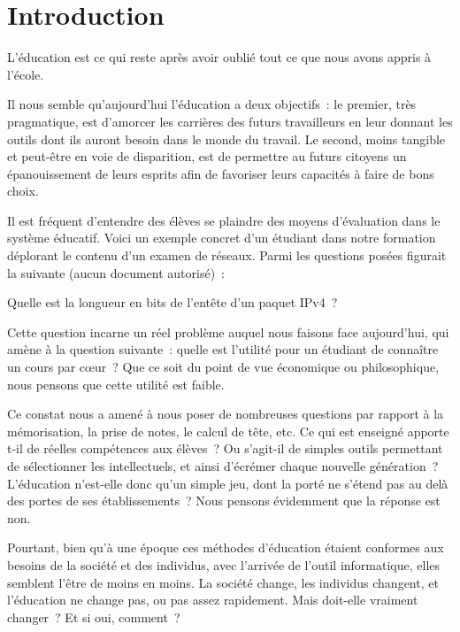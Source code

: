 
\chapter*{Introduction}\label{intro}

\begin{coolquote}
L'éducation est ce qui reste après avoir oublié tout ce que nous avons appris à l'école. 
\end{coolquote}

Il nous semble qu'aujourd'hui l'éducation a deux objectifs~: le premier, très pragmatique, est d’amorcer les carrières des futurs travailleurs en leur donnant les outils dont ils auront besoin dans le monde du travail. Le second, moins tangible et peut-être en voie de disparition, est de permettre au futurs citoyens un épanouissement de leurs esprits afin de favoriser leurs capacités à \og{}faire de bons choix\fg{}.

Il est fréquent d'entendre des élèves se plaindre des moyens d'évaluation dans le système éducatif. Voici un exemple concret d'un étudiant dans notre formation déplorant le contenu d'un examen de réseaux. Parmi les questions posées figurait la suivante (aucun document autorisé)~:

\begin{coolquote}Quelle est la
  longueur en bits de l'entête d'un paquet IPv4~?\end{coolquote}

Cette question incarne un réel problème auquel nous faisons face
aujourd'hui, qui amène à la question suivante~: quelle est l'utilité
pour un étudiant de connaître un cours par c\oe{}ur~? Que ce soit du
point de vue économique ou philosophique, nous pensons que cette
utilité est faible.

Ce constat nous a amené à nous poser de nombreuses questions par rapport à la mémorisation, la prise de notes, le calcul de tête, etc. Ce qui est enseigné apporte t-il de réelles compétences aux élèves~? Ou s'agit-il de simples outils permettant de sélectionner les intellectuels, et ainsi d’écrémer chaque nouvelle génération~? L'éducation n'est-elle donc qu'un simple jeu, dont la porté ne s'étend pas au delà des portes de ses établissements~? Nous pensons évidemment que la réponse est non.

Pourtant, bien qu'à une époque ces méthodes d'éducation étaient conformes aux besoins de la société et des individus, avec l'arrivée de l'outil informatique, elles semblent l'être de moins en moins. La société change, les individus changent, et l'éducation ne change pas, ou pas assez rapidement. Mais doit-elle vraiment changer~? Et si oui, comment~?

